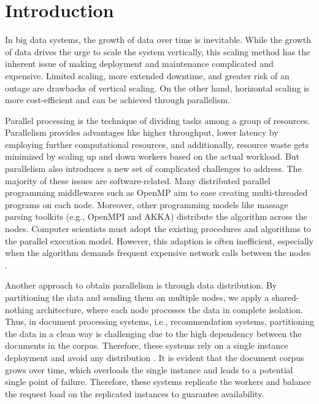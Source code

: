 \chapter{Introduction}

In big data systems, the growth of data over time is inevitable. While the growth of data drives the urge to scale the system vertically, this scaling method has the inherent issue of making deployment and maintenance complicated and expensive. Limited scaling, more extended downtime, and greater risk of an outage are drawbacks of vertical scaling. On the other hand, horizontal scaling is more cost-efficient and can be achieved through parallelism.


Parallel processing is the technique of dividing tasks among a group of resources. Parallelism provides advantages like higher throughput, lower latency by employing further computational resources, and additionally, resource waste gets minimized by scaling up and down workers based on the actual workload. But parallelism also introduces a new set of complicated challenges to address. The majority of these issues are software-related. Many distributed parallel programming middlewares such as OpenMP aim to ease creating multi-threaded programs on each node. Moreover, other programming models like massage parsing toolkits (e.g., OpenMPI and AKKA) distribute the algorithm across the nodes. Computer scientists must adopt the existing procedures and algorithms to the parallel execution model. However, this adaption is often inefficient, especially when the algorithm demands frequent expensive network calls between the nodes \cite{eksombatchaiPixieSystemRecommending2018, sharmaGraphJetRealtimeContent2016}.


Another approach to obtain parallelism is through data distribution. By partitioning the data and sending them on multiple nodes, we apply a shared-nothing architecture, where each node processes the data in complete isolation. Thus, in document processing systems, i.e., recommendation systems, partitioning the data in a clean way is challenging due to the high dependency between the documents in the corpus. Therefore, these systems rely on a single instance deployment and avoid any distribution \cite{ eksombatchaiPixieSystemRecommending2018, guptaWTFWhoFollow2013,sharmaGraphJetRealtimeContent2016}. It is evident that the document corpus grows over time, which overloads the single instance and leads to a potential single point of failure. Therefore, these systems replicate the workers and balance the request load on the replicated instances to guarantee availability.



